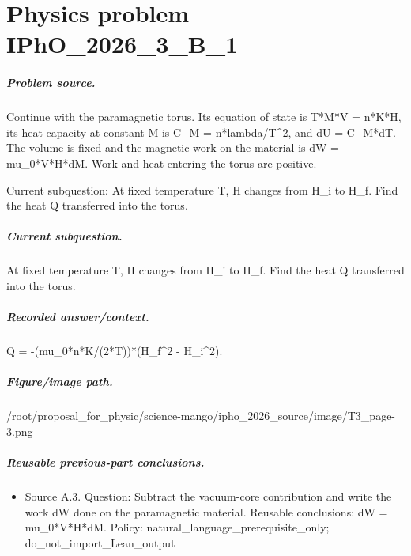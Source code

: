 
\chapter{Physics problem IPhO\_2026\_3\_B\_1}
\label{ch:IPhO2026Problems_problem_IPhO_2026_3_B_1}

\paragraph{Problem source.}
Continue with the paramagnetic torus.  Its equation of state is T*M*V = n*K*H,
its heat capacity at constant M is C\_M = n*lambda/T\textasciicircum{}2, and dU = C\_M*dT.
The volume is fixed and the magnetic work on the material is
dW = mu\_0*V*H*dM.  Work and heat entering the torus are positive.

Current subquestion:
At fixed temperature T, H changes from H\_i to H\_f. Find the heat Q transferred into the torus.

\paragraph{Current subquestion.}
At fixed temperature T, H changes from H\_i to H\_f. Find the heat Q transferred into the torus.

\paragraph{Recorded answer/context.}
Q = -(mu\_0*n*K/(2*T))*(H\_f\textasciicircum{}2 - H\_i\textasciicircum{}2).

\paragraph{Figure/image path.}
/root/proposal\_for\_physic/science-mango/ipho\_2026\_source/image/T3\_page-3.png

\paragraph{Reusable previous-part conclusions.}
\begin{itemize}
\item Source A.3. Question: Subtract the vacuum-core contribution and write the work dW done on the paramagnetic material. Reusable conclusions: dW = mu\_0*V*H*dM. Policy: natural\_language\_prerequisite\_only; do\_not\_import\_Lean\_output
\end{itemize}

